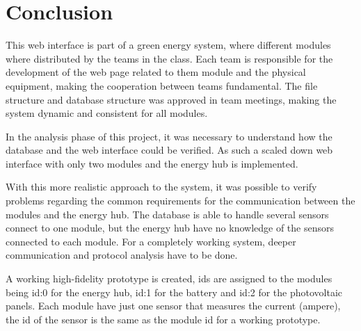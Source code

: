 \section{Conclusion}
This web interface is part of a green energy system, where different modules where distributed by the teams in the class. Each team is responsible for the development of the web page related to them module and the physical equipment, making the cooperation between teams fundamental. The file structure and database structure was approved in team meetings, making the system dynamic and consistent for all modules.

In the analysis phase of this project, it was necessary to understand how the database and the web interface could be verified. As such a scaled down web interface with only two modules and the energy hub is implemented.

With this more realistic approach to the system, it was possible to verify problems regarding the common requirements for the communication between the modules and the energy hub. The database is able to handle several sensors connect to one module, but the energy hub have no knowledge of the sensors connected to each module. For a completely working system, deeper communication and protocol analysis have to be done.

A working high-fidelity prototype is created, ids are assigned to the modules being id:0 for the energy hub, id:1 for the battery and id:2 for the photovoltaic panels. Each module have just one sensor that measures the current (ampere), the id of the sensor is the same as the module id for a working prototype.

